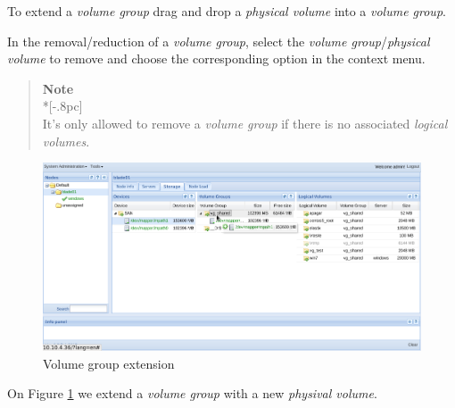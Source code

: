 To extend a \emph{volume group} drag and drop a \emph{physical volume} into a \emph{volume group}.

In the removal/reduction of a \emph{volume group}, select the \emph{volume group}/\emph{physical volume} to remove and choose the corresponding option in the context menu.

\begin{quote}
	{\large \bf Note} \\*[-.8pc]
	\underline{\hspace{6in}} \\
    It's only allowed to remove a \emph{volume group} if there is no associated \emph{logical volumes}.
\end{quote}
 
\begin{figure}[H]
        \begin{center}
        \includegraphics[scale=0.45]{screenshots/storage_vg_extend.png}
        \caption{Volume group extension}
        \label{fig:storage_vg_extend}
        \end{center}
\end{figure}

On Figure \ref{fig:storage_vg_extend} we extend a \emph{volume group} with a new \emph{physival volume}.

